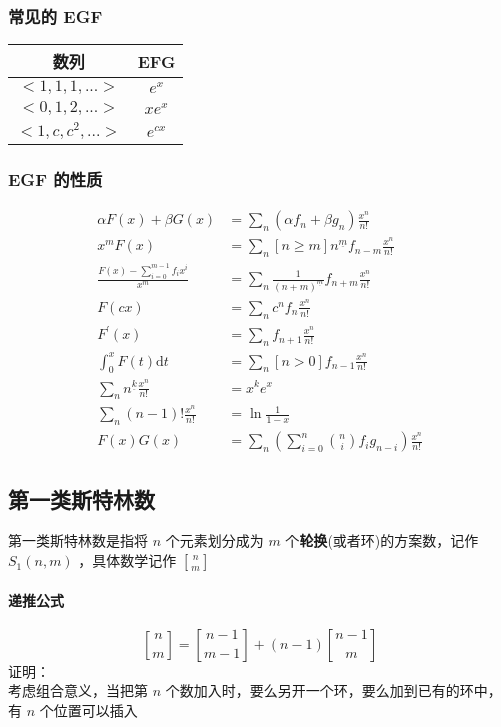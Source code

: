 	\subsubsection{常见的 EGF}
	\begin{center}
		\renewcommand\arraystretch{2.3}
		\renewcommand\tabcolsep{40.0pt}
		\begin{tabular}{|c|c|}
			\hline
			数列&EFG\\
			\hline
			$<1,1,1,...>$&$e^x$\\
			\hline
			$<0,1,2,...>$&$xe^x$\\
			\hline
			$<1,c,c^2,...>$&$e^{cx}$\\
			\hline
		\end{tabular}
	\end{center}
	\subsubsection{ EGF 的性质}	
	$$
	\begin{aligned}
	\alpha F(x)+\beta G(x)&=\sum_n(\alpha f_n+\beta g_n)\frac{x^n}{n!}\\
	x^mF(x)&=\sum_n[n\geq m]n^{\underline m}f_{n-m}\frac{x^n}{n!}\\
	\frac{F(x)-\sum_{i=0}^{m-1}f_ix^i}{x^m}&=\sum_n\frac1{(n+m)^{\underline m}}f_{n+m}\frac{x^n}{n!}\\
	F(cx)&=\sum_nc^nf_n\frac{x^n}{n!}\\
	F^\prime(x)&=\sum_nf_{n+1}\frac{x^n}{n!}\\
	\int_0^xF(t)\mathrm{d}t&=\sum_n[n>0]f_{n-1}\frac{x^n}{n!}\\
	\sum_{n}n^{\underline k}\frac{x^n}{n!}&=x^ke^x \\
	\sum_{n}(n-1)!\frac{x^n}{n!}&=\ln \frac{1}{1-x} \\
	F(x)G(x)&=\sum_n\left(\sum_{i=0}^n\binom nif_ig_{n-i}\right)\frac{x^n}{n!}
	\end{aligned}
	$$
	\newpage
	\subsection{第一类斯特林数}
	第一类斯特林数是指将 $n$ 个元素划分成为 $m$ 个\textbf{轮换}(或者环)的方案数，记作 $S_1(n,m)$ ，具体数学记作 $n\brack m$
	\paragraph{递推公式}
	$$
	{n\brack m}={n-1\brack m-1}+(n-1){n-1\brack m}
	$$
	证明：\\
	考虑组合意义，当把第 $n$ 个数加入时，要么另开一个环，要么加到已有的环中，有 $n$ 个位置可以插入\\
